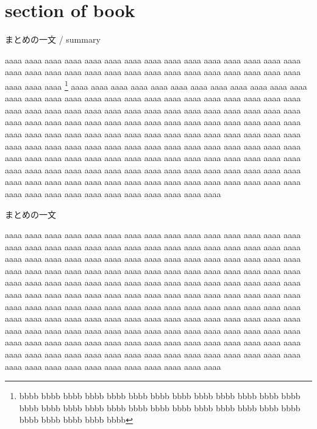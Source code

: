 \documentclass[10pt,dvipdfmx,landscape]{jsarticle}
\begin{document}
\section{section of book}
\begin{screen}
	まとめの一文 / summary
\end{screen}
%
aaaa aaaa aaaa aaaa aaaa aaaa aaaa aaaa aaaa aaaa aaaa 
aaaa aaaa aaaa aaaa aaaa aaaa aaaa aaaa aaaa aaaa aaaa 
aaaa aaaa aaaa aaaa aaaa aaaa aaaa aaaa aaaa aaaa aaaa 
\footnote{bbbb bbbb bbbb bbbb bbbb bbbb bbbb bbbb bbbb
bbbb bbbb bbbb bbbb bbbb bbbb bbbb bbbb bbbb bbbb bbbb 
bbbb bbbb bbbb bbbb bbbb bbbb bbbb bbbb bbbb bbbb bbbb} 
aaaa aaaa aaaa aaaa aaaa aaaa aaaa aaaa aaaa aaaa aaaa 
aaaa aaaa aaaa aaaa aaaa aaaa aaaa aaaa aaaa aaaa aaaa 
aaaa aaaa aaaa aaaa aaaa aaaa aaaa aaaa aaaa aaaa aaaa 
aaaa aaaa aaaa aaaa aaaa aaaa aaaa aaaa aaaa aaaa aaaa 
aaaa aaaa aaaa aaaa aaaa aaaa aaaa aaaa aaaa aaaa aaaa 
aaaa aaaa aaaa aaaa aaaa aaaa aaaa aaaa aaaa aaaa aaaa 
aaaa aaaa aaaa aaaa aaaa aaaa aaaa aaaa aaaa aaaa aaaa 
aaaa aaaa aaaa aaaa aaaa aaaa aaaa aaaa aaaa aaaa aaaa 
aaaa aaaa aaaa aaaa aaaa aaaa aaaa aaaa aaaa aaaa aaaa 
aaaa aaaa aaaa aaaa aaaa aaaa aaaa aaaa aaaa aaaa aaaa 
aaaa aaaa aaaa aaaa aaaa aaaa aaaa aaaa aaaa aaaa aaaa 
aaaa aaaa aaaa aaaa aaaa aaaa aaaa aaaa aaaa aaaa aaaa 
aaaa aaaa aaaa aaaa aaaa aaaa aaaa aaaa aaaa aaaa aaaa 
%
\newpage
\begin{screen}
	まとめの一文
\end{screen}
%
aaaa aaaa aaaa aaaa aaaa aaaa aaaa aaaa aaaa aaaa aaaa 
aaaa aaaa aaaa aaaa aaaa aaaa aaaa aaaa aaaa aaaa aaaa 
aaaa aaaa aaaa aaaa aaaa aaaa aaaa aaaa aaaa aaaa aaaa 
aaaa aaaa aaaa aaaa aaaa aaaa aaaa aaaa aaaa aaaa aaaa 
aaaa aaaa aaaa aaaa aaaa aaaa aaaa aaaa aaaa aaaa aaaa 
aaaa aaaa aaaa aaaa aaaa aaaa aaaa aaaa aaaa aaaa aaaa 
aaaa aaaa aaaa aaaa aaaa aaaa aaaa aaaa aaaa aaaa aaaa 
aaaa aaaa aaaa aaaa aaaa aaaa aaaa aaaa aaaa aaaa aaaa 
aaaa aaaa aaaa aaaa aaaa aaaa aaaa aaaa aaaa aaaa aaaa 
aaaa aaaa aaaa aaaa aaaa aaaa aaaa aaaa aaaa aaaa aaaa 
aaaa aaaa aaaa aaaa aaaa aaaa aaaa aaaa aaaa aaaa aaaa 
aaaa aaaa aaaa aaaa aaaa aaaa aaaa aaaa aaaa aaaa aaaa 
aaaa aaaa aaaa aaaa aaaa aaaa aaaa aaaa aaaa aaaa aaaa 
aaaa aaaa aaaa aaaa aaaa aaaa aaaa aaaa aaaa aaaa aaaa 
aaaa aaaa aaaa aaaa aaaa aaaa aaaa aaaa aaaa aaaa aaaa 
aaaa aaaa aaaa aaaa aaaa aaaa aaaa aaaa aaaa aaaa aaaa 
\end{document}
